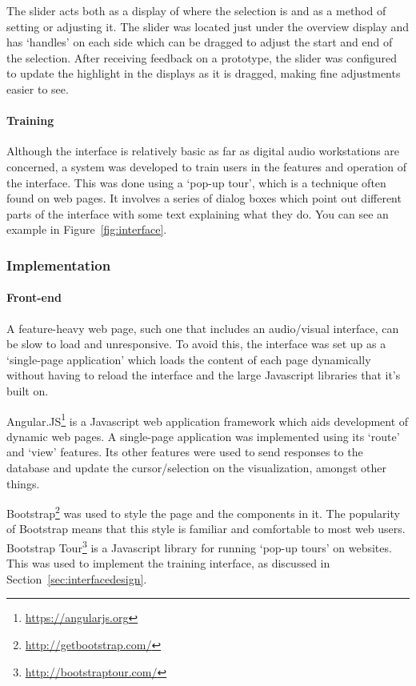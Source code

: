 The slider acts both as a display of where the selection is and as a method of
setting or adjusting it. The slider was located just under the overview display
and has `handles' on each side which can be dragged to adjust the start and end
of the selection. After receiving feedback on a prototype, the slider was
configured to update the highlight in the displays as it is dragged, making
fine adjustments easier to see.

\paragraph{Training}
Although the interface is relatively basic as far as digital audio workstations
are concerned, a system was developed to train users in the features and
operation of the interface. This was done using a `pop-up tour', which is
a technique often found on web pages. It involves a series of dialog boxes
which point out different parts of the interface with some text explaining what
they do. You can see an example in Figure~\ref{fig:interface}.

\subsubsection{Implementation}

\paragraph{Front-end}
A feature-heavy web page, such one that includes an audio/visual interface, can
be slow to load and unresponsive. To avoid this, the interface was set up as a
`single-page application' which loads the content of each page dynamically
without having to reload the interface and the large Javascript libraries that
it's built on.

Angular.JS\footnote{\url{https://angularjs.org}} is a Javascript web
application framework which aids development of dynamic web pages. A
single-page application was implemented using its `route' and `view' features.
Its other features were used to send responses to the database and update the
cursor/selection on the visualization, amongst other things.

Bootstrap\footnote{\url{http://getbootstrap.com/}} was used to style the page
and the components in it. The popularity of Bootstrap means that this style is
familiar and comfortable to most web users. Bootstrap
Tour\footnote{\url{http://bootstraptour.com/}} is a Javascript library for
running `pop-up tours' on websites. This was used to implement the training
interface, as discussed in Section~\ref{sec:interfacedesign}.

